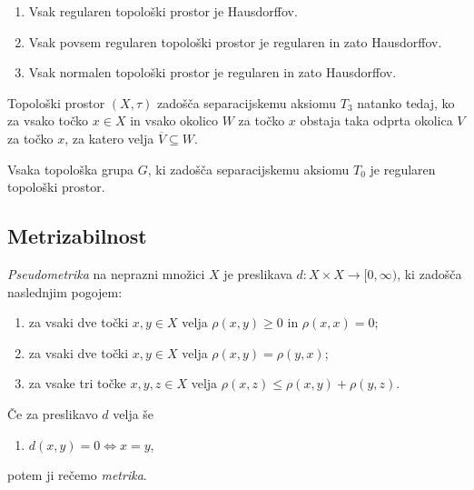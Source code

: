 \documentclass[mat1]{fmfdelo}
\newcommand{\closure}[1]{\overline{#1}}
\begin{document}
\begin{posledica}\label{pos:reghaus}
	\begin{enumerate}
		\item Vsak regularen topološki prostor je Hausdorffov.
		\item Vsak povsem regularen topološki prostor je regularen in zato Hausdorffov.
		\item Vsak normalen topološki prostor je regularen in zato Hausdorffov.
	\end{enumerate}
\end{posledica}

\begin{trditev}\label{def:kart3}
	Topološki prostor $(X, \tau)$ zadošča separacijskemu aksiomu $T_3$ natanko tedaj, ko za vsako točko $x \in X$ in vsako okolico $W$ za točko $x$ obstaja taka odprta okolica $V$ za točko $x$, za katero velja $\closure{V} \subseteq W$.
\end{trditev}

\begin{izrek}\label{izr:t3}
	Vsaka topološka grupa $G$, ki zadošča separacijskemu aksiomu $T_0$ je regularen topološki prostor.
\end{izrek}

\subsection{Metrizabilnost}

\begin{definicija}\label{def:metrika}
	\emph{Pseudometrika} na neprazni množici $X$ je preslikava $d: X \times X \to  [0, \infty)$, ki zadošča naslednjim pogojem:
	\begin{enumerate}
		\item za vsaki dve točki $x, y \in X$ velja $\rho (x, y) \geq 0$ in $\rho (x, x) = 0$;
		\item za vsaki dve točki $x, y \in X$ velja $\rho (x, y) = \rho (y, x)$;
		\item za vsake tri točke $x, y, z \in X$ velja $\rho (x, z) \leq \rho (x, y) + \rho (y, z)$.
	\end{enumerate}
	Če za preslikavo $d$ velja še
	\begin{enumerate}[resume]
		\item $d(x,y) = 0 \iff x = y$,
	\end{enumerate}
	potem ji rečemo \emph{metrika}.
\end{definicija}
\end{document}

